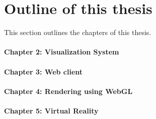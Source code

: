 \section{Outline of this thesis}

This section outlines the chapters of this thesis.

\paragraph{Chapter 2: Visualization System}

\paragraph{Chapter 3: Web client}

\paragraph{Chapter 4: Rendering using WebGL}

\paragraph{Chapter 5: Virtual Reality}